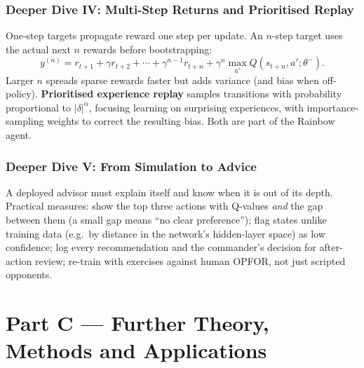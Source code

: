 \documentclass[11pt]{article}
\begin{document}
\section{Deeper Dive IV: Multi-Step Returns and Prioritised Replay}
One-step targets propagate reward one step per update. An $n$-step target uses the actual next $n$ rewards before bootstrapping:
\[y^{(n)}=r_{t+1}+\gamma r_{t+2}+\cdots+\gamma^{n-1}r_{t+n}+\gamma^n\max_{a'}Q(s_{t+n},a';\theta^-).\]
Larger $n$ spreads sparse rewards faster but adds variance (and bias when off-policy). \textbf{Prioritised experience replay} samples transitions with probability proportional to $|\delta|^\alpha$, focusing learning on surprising experiences, with importance-sampling weights to correct the resulting bias. Both are part of the Rainbow agent.

\section{Deeper Dive V: From Simulation to Advice}
A deployed advisor must explain itself and know when it is out of its depth. Practical measures: show the top three actions with Q-values \emph{and} the gap between them (a small gap means ``no clear preference''); flag states unlike training data (e.g.\ by distance in the network's hidden-layer space) as low confidence; log every recommendation and the commander's decision for after-action review; re-train with exercises against human OPFOR, not just scripted opponents.

\clearpage
\part*{Part C --- Further Theory, Methods and Applications}
\end{document}
